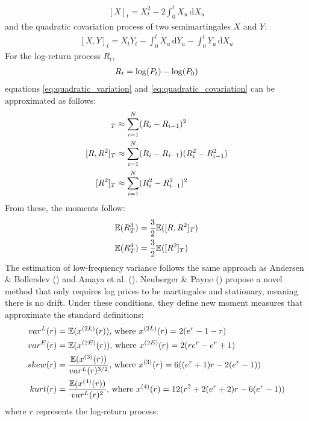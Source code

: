 \begin{align}
    \label{eq:quadratic_variation}
    [X]_t = X_t^2 - 2\int_0^tX_u\,\mathrm{d}X_u
\end{align}
and the quadratic covariation process of two semimartingales $X$ and $Y$:
\begin{align}
    \label{eq:quadratic_covariation}
    [X,Y]_t = X_tY_t - \int_0^tX_u\,\mathrm{d}Y_u - \int_0^tY_u\,\mathrm{d}X_u
\end{align}
For the log-return process $R_t$,
\begin{align}
    R_t = \log(P_t) - \log(P_0)\notag
\end{align}
equations \eqref{eq:quadratic_variation} and \eqref{eq:quadratic_covariation} can be approximated as follows:
\begin{align}
    [R]_T &\approx \sum_{i=1}^N (R_i - R_{i-1})^2\notag\\
    [R,R^2]_T &\approx \sum_{i=1}^N (R_i - R_{i-1})(R_i^2 - R_{i-1}^2)\notag \\
    [R^2]_T &\approx \sum_{i=1}^N (R_i^2 - R_{i-1}^2)^2\notag
\end{align}
From these, the moments follow:
\begin{align}
    \mathbb{E}(R_T^3) &= \frac{3}{2}\mathbb{E}([R,R^2]_T)\notag\\
    \mathbb{E}(R_T^4) &= \frac{3}{2}\mathbb{E}([R^2]_T)\notag
\end{align}
The estimation of low-frequency variance follows the same approach as Andersen \& Bollerslev (\citeyear{andersenAnsweringSkepticsYes1998}) and Amaya et al. (\citeyear{amayaDoesRealizedSkewness2015}). Neuberger \& Payne (\citeyear{neubergerSkewnessStockMarket2021}) propose a novel method that only requires log prices to be martingales and stationary, meaning there is no drift. Under these conditions, they define new moment measures that approximate the standard definitions:
\begin{align}
    var^L(r) &= \mathbb{E}(x^{(2L)}(r))\text{, where } x^{(2L)}(r) = 2(e^r-1-r) \notag \\
    var^E(r) &= \mathbb{E}(x^{(2E)}(r))\text{, where } x^{(2E)}(r) = 2(re^r-e^r+1) \notag \\
    skew(r) &= \frac{\mathbb{E}(x^{(3)}(r))}{var^L(r)^{3/2}}\text{, where } x^{(3)}(r) = 6((e^r+1)r - 2(e^r-1)) \notag \\
    kurt(r) &= \frac{\mathbb{E}(x^{(4)}(r))}{var^L(r)^2}\text{, where } x^{(4)}(r) = 12(r^2 + 2(e^r+2)r - 6(e^r-1)) \notag
\end{align}
where $r$ represents the log-return process:
